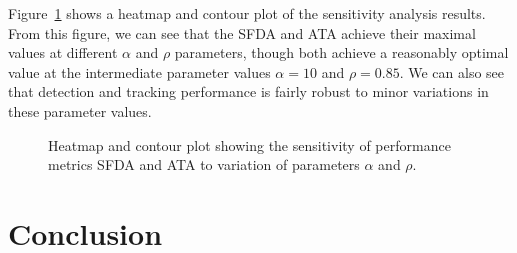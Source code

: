 \documentclass[twocolumn, final]{svjour3}
\begin{document}
Figure~\ref{fig:sens_surf} shows a heatmap and contour plot of the sensitivity analysis results. From this figure, we can see that the SFDA and ATA achieve their maximal values at different $\alpha$ and $\rho$ parameters, though both achieve a reasonably optimal value at the intermediate parameter values $\alpha = 10$ and $\rho = 0.85$. We can also see that detection and tracking performance is fairly robust to minor variations in these parameter values.

\begin{figure}[!]
  \centering             
  \hspace{6mm}
  \caption{Heatmap and contour plot showing the sensitivity of performance metrics SFDA and ATA to variation of parameters $\alpha$ and $\rho$.}
  \label{fig:sens_surf}
\end{figure}




\section{Conclusion}
\label{sec:conclusion}
\end{document}
